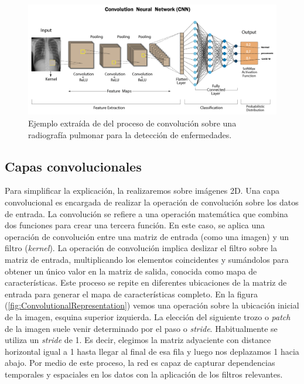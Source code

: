 \begin{figure}[htp]
  \centering
  \includegraphics[width=\textwidth]{imagenes/chapter2/RadiographyConvolutionExample.png}
  \caption{Ejemplo extraída de \cite{RadiographyConvolutionExample} del proceso de convolución sobre una radiografía pulmonar 
  para la detección de enfermedades.}
  \label{fig:RadiographyConvolutionExample}
\end{figure}

\subsection{Capas convolucionales}
Para simplificar la explicación, la realizaremos sobre imágenes 2D. 
Una capa convolucional es encargada de realizar la operación de convolución sobre 
los datos de entrada. 
La convolución se refiere a una operación matemática que combina dos funciones para crear una tercera función.
En este caso, se aplica una operación de convolución 
entre una matriz de entrada (como una imagen) y un filtro (\emph{kernel}).
La operación de convolución implica deslizar el filtro sobre la matriz de entrada, 
multiplicando los elementos coincidentes y sumándolos para obtener un único valor 
en la matriz de salida, conocida como mapa de características. 
Este proceso se repite en diferentes ubicaciones de la matriz de 
entrada para generar el mapa de características completo. En la figura 
(\ref{fig:ConvolutionalRepresentation}) vemos una operación sobre la ubicación 
inicial de la imagen, esquina superior izquierda. 
La elección del siguiente trozo 
o \emph{patch} de la imagen suele venir determinado por el paso o \emph{stride}.
Habitualmente se utiliza un \emph{stride} de 1. Es decir, elegimos la matriz 
adyaciente con distance horizontal igual a 1 hasta llegar al final de esa fila 
y luego nos deplazamos 1 hacia abajo. 
Por medio de este proceso, la red es capaz de
capturar dependencias temporales y espaciales en los datos con la aplicación
de los filtros relevantes.

